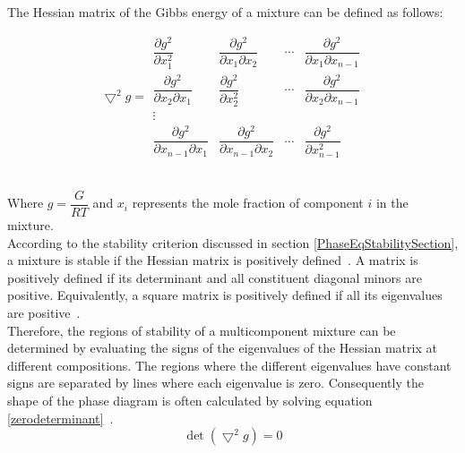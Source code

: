 The Hessian matrix of the Gibbs energy of a mixture can be defined as follows:\

\begin{equation}
\bigtriangledown^{2} g = \begin{array}{|cccc|}
  \dfrac{\partial g^{2}}{\partial x_{1}^{2}} & \dfrac{\partial g^{2}}{\partial x_{1}\partial x_{2}} & \cdots & \dfrac{\partial g^{2}}{\partial x_{1}\partial x_{n-1}} \\
  \dfrac{\partial g^{2}}{\partial x_{2}\partial x_{1}} & \dfrac{\partial g^{2}}{\partial x_{2}^{2}} & \cdots & \dfrac{\partial g^{2}}{\partial x_{2}\partial x_{n-1}} \\
  \vdots & & & \\
  \dfrac{\partial g^{2}}{\partial x_{n-1}\partial x_{1}} & \dfrac{\partial g^{2}}{\partial x_{n-1}\partial x_{2}} & \cdots & \dfrac{\partial g^{2}}{\partial x_{n-1}^{2}}
\end{array}
\end{equation}\


Where $g = \dfrac{G}{RT}$ and $x_{i}$ represents the mole fraction of component $i$ in the mixture.\\

According to the stability criterion discussed in section \ref{PhaseEqStabilitySection}, a mixture is stable if the Hessian matrix is positively defined~\cite{HessianPhaseEquilibriumCriterion}. A matrix is positively defined if its determinant and all constituent diagonal minors are positive. Equivalently, a square matrix is positively defined if all its eigenvalues are positive~\cite{NumericalAnalysis, HessianPhaseEquilibriumCriterion}.\\

Therefore, the regions of stability of a multicomponent mixture can be determined by evaluating the signs of the eigenvalues of the Hessian matrix at different compositions. The regions where the different eigenvalues have constant signs are separated by lines where each eigenvalue is zero. Consequently the shape of the phase diagram is often calculated by solving equation \ref{zerodeterminant}~\cite{HessianPhaseEquilibriumCriterion}.\\

\begin{equation}
\det \left(\bigtriangledown^{2} g\right) = 0 \label{zerodeterminant}
\end{equation}\

